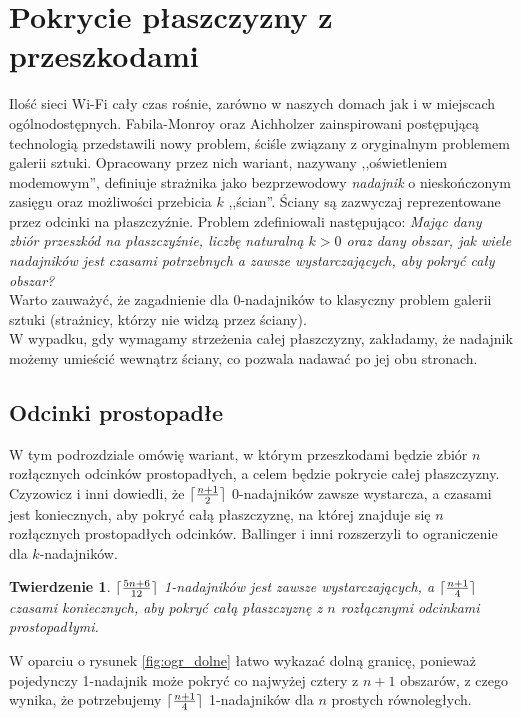 \documentclass[brudnopis]{xmgr}
\DeclarePairedDelimiter\ceil{\lceil}{\rceil}
\newtheorem{Twierdzenie}{Twierdzenie}
\theoremstyle{definition}
\begin{document}
\section{Pokrycie płaszczyzny z przeszkodami}\label{sec:knadajniki}
	Ilość sieci Wi-Fi cały czas rośnie, zarówno w naszych domach jak i w miejscach ogólnodostępnych. Fabila-Monroy oraz Aichholzer \cite{fabilamonroy} zainspirowani postępującą technologią przedstawili nowy problem, ściśle związany z oryginalnym problemem galerii sztuki. Opracowany przez nich wariant, nazywany ,,oświetleniem modemowym'', definiuje strażnika jako bezprzewodowy \emph{nadajnik} o nieskończonym zasięgu oraz możliwości przebicia $k$ ,,ścian''. Ściany są zazwyczaj reprezentowane przez odcinki na płaszczyźnie. Problem zdefiniowali następująco: \emph{Mając dany zbiór przeszkód na płaszczyźnie, liczbę naturalną $k > 0$ oraz dany obszar, jak wiele nadajników jest czasami potrzebnych a zawsze wystarczających, aby pokryć cały obszar?}  
\\\indent Warto zauważyć, że zagadnienie dla 0-nadajników to klasyczny problem galerii sztuki (strażnicy, którzy nie widzą przez ściany).
\\\indent W wypadku, gdy wymagamy strzeżenia całej płaszczyzny, zakładamy, że nadajnik możemy umieścić wewnątrz ściany, co pozwala nadawać po jej obu stronach.
\subsection{Odcinki prostopadłe}
W tym podrozdziale omówię wariant, w którym przeszkodami będzie zbiór $n$ rozłącznych odcinków prostopadłych, a celem będzie pokrycie całej płaszczyzny. Czyzowicz i inni \cite{czyzowicz} dowiedli, że $\ceil{\frac{n+1}{2}}$ 0-nadajników zawsze wystarcza, a czasami jest koniecznych, aby pokryć całą płaszczyznę, na której znajduje się $n$ rozłącznych prostopadłych odcinków. Ballinger i inni \cite{knadajniki} rozszerzyli to ograniczenie dla $k$-nadajników.

\begin{Twierdzenie} \label{ograniczenie zbiór odcinków prostopadłych} \cite{knadajniki}
  $\ceil{\frac{5n+6}{12}}$ 1-nadajników jest zawsze wystarczających, a $\ceil{\frac{n+1}{4}}$ czasami koniecznych, aby pokryć całą płaszczyznę z $n$ rozłącznymi odcinkami prostopadłymi.
\end{Twierdzenie}
\indent W oparciu o rysunek \ref{fig:ogr_dolne} łatwo wykazać dolną granicę, ponieważ pojedynczy 1-nadajnik może pokryć co najwyżej cztery z $n + 1$ obszarów, z czego wynika, że potrzebujemy $\ceil{\frac{n+1}{4}}$ 1-nadajników dla $n$ prostych równoległych.
\end{document}
